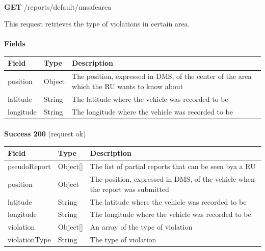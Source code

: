 							\paragraph{}
						\textbf{GET} /reports/default/unsafearea
						
						This request retrieves the type of violations in certain area.
						\paragraph{}
							\textbf{Fields}
							\begin{table}[!h]
								\begin{tabular}{L{0.25\textwidth}L{0.15\textwidth}L{0.4\textwidth}}
									\toprule
									Field & Type & Description \\
									\midrule
								 	position & Object & The position, expressed in DMS, of the center of the area which the RU wants to know about \\
								 	\hspace{2.5mm}latitude & String & The latitude where the vehicle was recorded to be \\
								 	\hspace{2.5mm}longitude & String & The longitude where the vehicle was recorded to be \\
								 	\bottomrule
								\end{tabular}
							\end{table}
						\paragraph{}
							\textbf{Success 200} (request ok)
							\begin{table}[!h]
								\begin{tabular}{L{0.25\textwidth}L{0.1\textwidth}L{0.45\textwidth}}
									\toprule
									Field & Type & Description \\
									\midrule
									pseudoReport & Object[] & The list of partial reports that can be seen bya a RU \\
									\hspace{2.5mm}position & Object & The position, expressed in DMS, of the vehicle when the report was submitted  \\
									\hspace{5mm}latitude & String & The latitude where the vehicle was recorded to be \\
									\hspace{5mm}longitude & String & The longitude where the vehicle was recorded to be \\
									\hspace{2.5mm}violation & Object[] & An array of the type of violation \\
									\hspace{5mm}violationType & String & The type of violation \\
								 	\bottomrule
								\end{tabular}
							\end{table}
